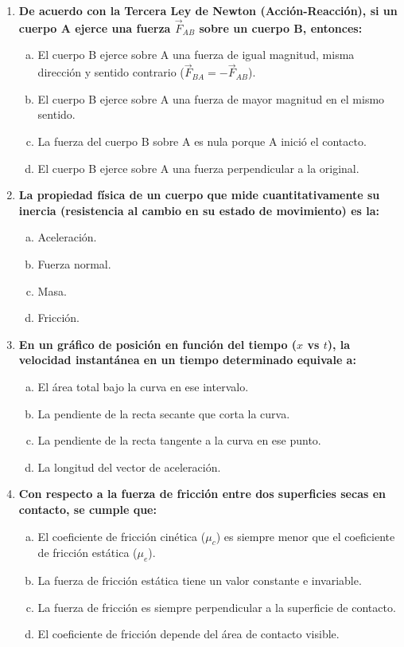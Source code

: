 \documentclass[11pt,a4paper]{article}
\begin{document}
\begin{enumerate}
    \item \textbf{De acuerdo con la Tercera Ley de Newton (Acción-Reacción), si un cuerpo A ejerce una fuerza $\vec{F}_{AB}$ sobre un cuerpo B, entonces:}
    \begin{enumerate}[a)]
        \item El cuerpo B ejerce sobre A una fuerza de igual magnitud, misma dirección y sentido contrario ($\vec{F}_{BA} = -\vec{F}_{AB}$).
        \item El cuerpo B ejerce sobre A una fuerza de mayor magnitud en el mismo sentido.
        \item La fuerza del cuerpo B sobre A es nula porque A inició el contacto.
        \item El cuerpo B ejerce sobre A una fuerza perpendicular a la original.
    \end{enumerate}

    \item \textbf{La propiedad física de un cuerpo que mide cuantitativamente su inercia (resistencia al cambio en su estado de movimiento) es la:}
    \begin{enumerate}[a)]
        \item Aceleración.
        \item Fuerza normal.
        \item Masa.
        \item Fricción.
    \end{enumerate}

    \item \textbf{En un gráfico de posición en función del tiempo ($x$ vs $t$), la velocidad instantánea en un tiempo determinado equivale a:}
    \begin{enumerate}[a)]
        \item El área total bajo la curva en ese intervalo.
        \item La pendiente de la recta secante que corta la curva.
        \item La pendiente de la recta tangente a la curva en ese punto.
        \item La longitud del vector de aceleración.
    \end{enumerate}

    \item \textbf{Con respecto a la fuerza de fricción entre dos superficies secas en contacto, se cumple que:}
    \begin{enumerate}[a)]
        \item El coeficiente de fricción cinética ($\mu_c$) es siempre menor que el coeficiente de fricción estática ($\mu_e$).
        \item La fuerza de fricción estática tiene un valor constante e invariable.
        \item La fuerza de fricción es siempre perpendicular a la superficie de contacto.
        \item El coeficiente de fricción depende del área de contacto visible.
    \end{enumerate}


\end{enumerate}
\end{document}

